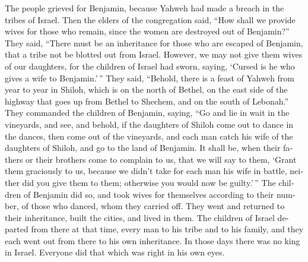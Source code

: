 \begin{paracol}{2}
\begin{otherlanguage}{english}
 The people grieved for Benjamin, because Yahweh had made
a breach in the tribes of Israel.  Then the elders of the
congregation said, ``How shall we provide wives for those who remain,
since the women are destroyed out of Benjamin?''  They
said, ``There must be an inheritance for those who are escaped of
Benjamin, that a tribe not be blotted out from Israel. 
However, we may not give them wives of our daughters, for the children
of Israel had sworn, saying, `Cursed is he who gives a wife to
Benjamin.'\,''  They said, ``Behold, there is a feast of
Yahweh from year to year in Shiloh, which is on the north of Bethel, on
the east side of the highway that goes up from Bethel to Shechem, and on
the south of Lebonah.''  They commanded the children of
Benjamin, saying, ``Go and lie in wait in the vineyards, 
and see, and behold, if the daughters of Shiloh come out to dance in the
dances, then come out of the vineyards, and each man catch his wife of
the daughters of Shiloh, and go to the land of Benjamin. 
It shall be, when their fathers or their brothers come to complain to
us, that we will say to them, `Grant them graciously to us, because we
didn't take for each man his wife in battle, neither did you give them
to them; otherwise you would now be guilty.'\,''  The
children of Benjamin did so, and took wives for themselves according to
their number, of those who danced, whom they carried off. They went and
returned to their inheritance, built the cities, and lived in them.
 The children of Israel departed from there at that time,
every man to his tribe and to his family, and they each went out from
there to his own inheritance.  In those days there was no
king in Israel. Everyone did that which was right in his own eyes.
\end{otherlanguage} \end{paracol}
